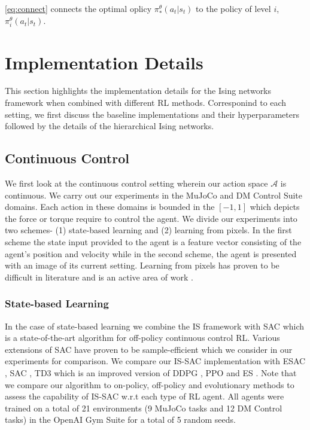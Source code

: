 \documentclass{article}
\begin{document}
\autoref{eq:connect} connects the optimal oplicy $\pi^{\theta}_{*}(a_{t}|s_{t})$ to the policy of level $i$, $\pi^{\theta}_{i}(a_{t}|s_{t})$. 

\section{Implementation Details}
This section highlights the implementation details for the Ising networks framework when combined with different RL methods. Corresponind to each setting, we first discuss the baseline implementations and their hyperparameters followed by the details of the hierarchical Ising networks. 

\subsection{Continuous Control}
We first look at the continuous control setting wherein our action space $\mathcal{A}$ is continuous. We carry out our experiments in the MuJoCo \cite{mujoco} and DM Control Suite \cite{dm} domains. Each action in these domains is bounded in the $[-1,1]$ which depicts the force or torque require to control the agent. We divide our experiments into two schemes- (1) state-based learning and (2) learning from pixels. In the first scheme the state input provided to the agent is a feature vector consisting of the agent's position and velocity while in the second scheme, the agent is presented with an image of its current setting. Learning from pixels has proven to be difficult in literature \cite{dm,dreamer} and is an active area of work \cite{rad,curl}.

\subsubsection{State-based Learning}
In the case of state-based learning we combine the IS framework with SAC \cite{sac} which is a state-of-the-art algorithm for off-policy continuous control RL. Various extensions of SAC have proven to be sample-efficient \cite{esac} which we consider in our experiments for comparison. We compare our IS-SAC implementation with ESAC \cite{esac}, SAC \cite{sac}, TD3 \cite{td3} which is an improved version of DDPG \cite{ddpg}, PPO \cite{ppo} and ES \cite{es}. Note that we compare our algorithm to on-policy, off-policy and evolutionary methods to assess the capability of IS-SAC w.r.t each type of RL agent. All agents were trained on a total of 21 environments (9 MuJoCo tasks and 12 DM Control tasks) in the OpenAI Gym Suite \cite{gym} for a total of 5 random seeds.
\end{document}
